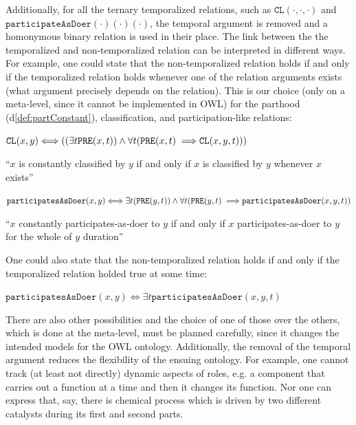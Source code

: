 \documentclass[sw]{iosart2x}
\newcommand{\bflist}{\begin{list}{}{\setlength{\topsep}{2mm}\setlength{\partopsep}{0mm}\setlength{\parsep}{0mm}\setlength{\leftmargin}{9mm}\setlength{\labelwidth}{8mm}}}
\newcommand{\eflist}{\end{list}}
\newcommand{\DefLabel}{\textrm{d}}
\newcommand{\ExLabel}{\textrm{ex}}
\newcounter{cntdef}
\newcommand{\mydf}[1]{\refstepcounter{cntdef}\begin{small}{\bf \DefLabel\thecntdef\label{def:#1}}\end{small}}
\newcommand{\myex}[1]{\refstepcounter{cntex}\begin{small}{\bf \ExLabel\thecntex\label{ex:#1}}\end{small}}
\newcounter{cntex}
\newcommand{\mytext}[1]{``#1''}
\newcommand{\refdf}[1]{({\DefLabel}\ref{#1})}
\newcommand{\generalStyle}[1]{\texttt{#1}}
\newcommand{\biRel}[3]{\generalStyle{#1}(#2,#3)}
\newcommand{\triRel}[4]{\generalStyle{#1}(#2,#3,#4)}
\newcommand{\myiff}{\Longleftrightarrow}
\newcommand{\myfi}{\hspace{0.9mm} \Longrightarrow}
\newcommand{\OWL}{\textnormal{OWL}\xspace}
\newcommand{\DOLCECLbyBinary}[2]{\biRel{CL}{#1}{#2}}
\newcommand{\DOLCECLby}[3]{\triRel{CL}{#1}{#2}{#3}}
\newcommand{\DOLCEPRE}[2]{\biRel{PRE}{#1}{#2}}
\newcommand{\participateAsDoer}[3]{\triRel{participatesAsDoer}{#1}{#2}{#3}}
\newcommand{\participateAsDoerBinary}[2]{\biRel{participatesAsDoer}{#1}{#2}}
\newcommand{\playAs}[3]{\triRel{playAs}{#1}{#2}{#3}}
\newcommand{\myComment}[1]{}
\begin{document}
Additionally, for all the ternary temporalized relations, such as $\DOLCECLby{\cdot}{\cdot}{\cdot}$ \myComment{, $\playAs{\cdot}{\cdot}{\cdot}$,} and $\hspace{0pt}\texttt{participateAsDoer}(\cdot)(\cdot)(\cdot)$, the temporal argument is removed and a homonymous binary relation is used in their place.
The link between the the temporalized and non-temporalized relation can be interpreted in different ways. For example, one could state that the non-temporalized relation holds if and only if the temporalized relation holds whenever one of the relation arguments exists (what argument precisely depends on the relation). This is our choice (only on a meta-level, since it cannot be implemented in \OWL) for the parthood \refdf{def:partConstant}, classification, and participation-like relations:
\bflist
\item[\mydf{CLnontemp}] $ \DOLCECLbyBinary{x}{y} \myiff ((\exists t \DOLCEPRE{x}{t}) \land \forall t (\DOLCEPRE{x}{t} \myfi  \DOLCECLby{x}{y}{t})) $
\item \mytext{$x$ is constantly classified by $y$ if and only if $x$ is classified by $y$ whenever $x$ exists}
\item[\mydf{participationDoerNonTemp}] $ \participateAsDoerBinary{x}{y} \myiff \exists t (\DOLCEPRE{y}{t}) \land \forall t (\DOLCEPRE{y}{t} \myfi \participateAsDoer{x}{y}{t})$
\item \mytext{$x$ constantly participates-as-doer to $y$ if and only if $x$ participates-as-doer to $y$ for the whole of $y$ duration}
\eflist
One could also state that the non-temporalized relation holds if and only if the temporalized relation holded true at some time:%
\bflist
\item[\myex{participationDoerNonTempBIS}] $ \participateAsDoerBinary{x}{y} \myiff \exists t \participateAsDoer{x}{y}{t}$
\eflist
There are also other possibilities and the choice of one of those over the others, which is done at the meta-level, must be planned carefully, since it changes the intended models for the \OWL ontology.
Additionally, the removal of the temporal argument reduces the flexibility of the ensuing ontology. For example, one cannot track (at least not directly) dynamic aspects of roles, e.g. a component that carries out a function at a time and then it changes its function. Nor one can express that, say, there is chemical process which is driven by two different catalysts during its first and second parts.
\end{document}
